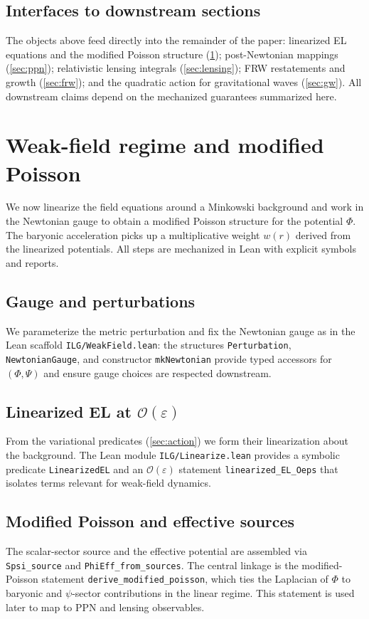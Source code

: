 \documentclass[aps,prd,twocolumn,superscriptaddress,nofootinbib,floatfix,longbibliography]{revtex4-2}
\newcommand{\Order}{\mathcal{O}}
\newcommand{\lean}[1]{\texttt{#1}}
\begin{document}
\subsection{Interfaces to downstream sections}
The objects above feed directly into the remainder of the paper: linearized EL equations and the modified Poisson structure (\cref{sec:weakfield}); post-Newtonian mappings (\cref{sec:ppn}); relativistic lensing integrals (\cref{sec:lensing}); FRW restatements and growth (\cref{sec:frw}); and the quadratic action for gravitational waves (\cref{sec:gw}). All downstream claims depend on the mechanized guarantees summarized here.

\section{Weak-field regime and modified Poisson}\label{sec:weakfield}

We now linearize the field equations around a Minkowski background and work in the Newtonian gauge to obtain a modified Poisson structure for the potential $\Phi$. The baryonic acceleration picks up a multiplicative weight $w(r)$ derived from the linearized potentials. All steps are mechanized in Lean with explicit symbols and reports.

\subsection{Gauge and perturbations}
We parameterize the metric perturbation and fix the Newtonian gauge as in the Lean scaffold \texttt{ILG/WeakField.lean}: the structures \lean{Perturbation}, \lean{NewtonianGauge}, and constructor \lean{mkNewtonian} provide typed accessors for $(\Phi,\Psi)$ and ensure gauge choices are respected downstream.

\subsection{Linearized EL at $\Order(\varepsilon)$}
From the variational predicates (\cref{sec:action}) we form their linearization about the background. The Lean module \texttt{ILG/Linearize.lean} provides a symbolic predicate \lean{LinearizedEL} and an $\Order(\varepsilon)$ statement \lean{linearized_EL_Oeps} that isolates terms relevant for weak-field dynamics.

\subsection{Modified Poisson and effective sources}
The scalar-sector source and the effective potential are assembled via \lean{Spsi_source} and \lean{PhiEff_from_sources}. The central linkage is the modified-Poisson statement \lean{derive_modified_poisson}, which ties the Laplacian of $\Phi$ to baryonic and $\psi$-sector contributions in the linear regime. This statement is used later to map to PPN and lensing observables.
\end{document}
